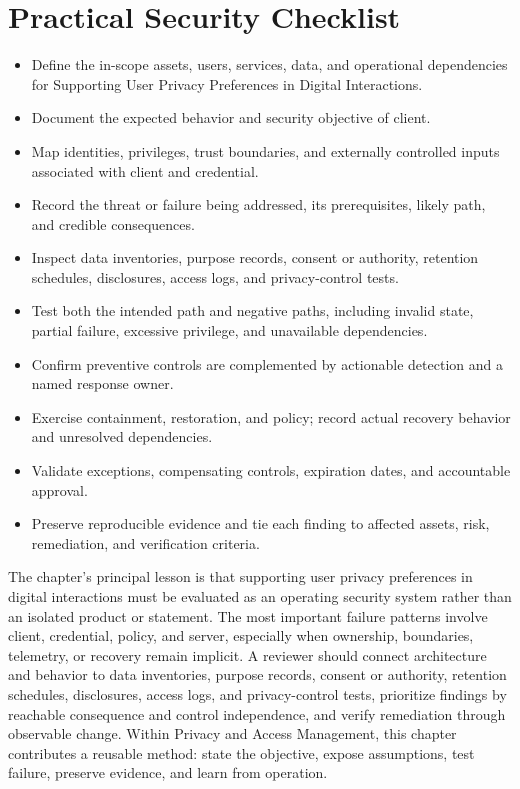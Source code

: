 \documentclass[11pt]{article}
\begin{document}
\section*{Practical Security Checklist}
\begin{itemize}[label=$\square$]
\item Define the in-scope assets, users, services, data, and operational dependencies for Supporting User Privacy Preferences in Digital Interactions.
\item Document the expected behavior and security objective of client.
\item Map identities, privileges, trust boundaries, and externally controlled inputs associated with client and credential.
\item Record the threat or failure being addressed, its prerequisites, likely path, and credible consequences.
\item Inspect data inventories, purpose records, consent or authority, retention schedules, disclosures, access logs, and privacy-control tests.
\item Test both the intended path and negative paths, including invalid state, partial failure, excessive privilege, and unavailable dependencies.
\item Confirm preventive controls are complemented by actionable detection and a named response owner.
\item Exercise containment, restoration, and policy; record actual recovery behavior and unresolved dependencies.
\item Validate exceptions, compensating controls, expiration dates, and accountable approval.
\item Preserve reproducible evidence and tie each finding to affected assets, risk, remediation, and verification criteria.
\end{itemize}
\begin{synthesisbox}
The chapter's principal lesson is that supporting user privacy preferences in digital interactions must be evaluated as an operating security system rather than an isolated product or statement. The most important failure patterns involve client, credential, policy, and server, especially when ownership, boundaries, telemetry, or recovery remain implicit. A reviewer should connect architecture and behavior to data inventories, purpose records, consent or authority, retention schedules, disclosures, access logs, and privacy-control tests, prioritize findings by reachable consequence and control independence, and verify remediation through observable change. Within Privacy and Access Management, this chapter contributes a reusable method: state the objective, expose assumptions, test failure, preserve evidence, and learn from operation.
\end{synthesisbox}
\end{document}
